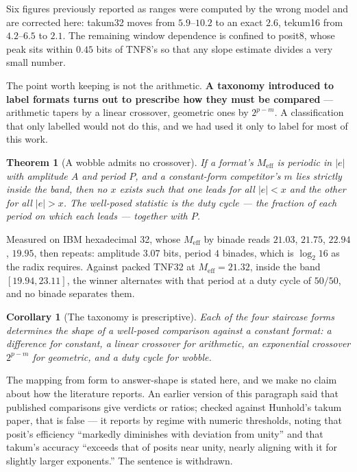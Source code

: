 \documentclass[11pt]{article}
\newtheorem{theorem}{Theorem}
\newtheorem{corollary}{Corollary}
\theoremstyle{definition}
\begin{document}
Six figures previously reported as ranges were computed by the wrong model and
are corrected here: takum32 moves from $5.9$--$10.2$ to an exact $2.6$, tekum16
from $4.2$--$6.5$ to $2.1$. The remaining window dependence is confined to
posit8, whose peak sits within $0.45$ bits of TNF8's so that any slope estimate
divides a very small number.

The point worth keeping is not the arithmetic. \textbf{A taxonomy introduced to label
formats turns out to prescribe how they must be compared} --- arithmetic tapers
by a linear crossover, geometric ones by $2^{p-m}$. A classification that only
labelled would not do this, and we had used it only to label for most of this
work.



\begin{theorem}[A wobble admits no crossover]
\label{thm:wobblecross}
If a format's $M_{\mathrm{eff}}$ is periodic in $|e|$ with amplitude $A$ and
period $P$, and a constant-form competitor's $m$ lies strictly inside the band,
then no $x$ exists such that one leads for all $|e| < x$ and the other for all
$|e| > x$. The well-posed statistic is the duty cycle --- the fraction of each
period on which each leads --- together with $P$.
\end{theorem}

Measured on IBM hexadecimal 32, whose $M_{\mathrm{eff}}$ by binade reads
$21.03$, $21.75$, $22.94$, $19.95$, then repeats: amplitude $3.07$ bits, period
$4$ binades, which is $\log_2 16$ as the radix requires. Against packed TNF32 at
$M_{\mathrm{eff}} = 21.32$, inside the band $[19.94, 23.11]$, the winner
alternates with that period at a duty cycle of $50/50$, and no binade separates
them.

\begin{corollary}[The taxonomy is prescriptive]
\label{cor:taxprescribes}
Each of the four staircase forms determines the \emph{shape} of a well-posed
comparison against a constant format: a difference for constant, a linear
crossover for arithmetic, an exponential crossover $2^{p-m}$ for geometric, and a
duty cycle for wobble.
\end{corollary}

The mapping from form to answer-shape is stated here, and we make no claim about
how the literature reports. An earlier version of this paragraph said that
published comparisons give verdicts or ratios; checked against Hunhold's takum
paper, that is false --- it reports by regime with numeric thresholds, noting
that posit's efficiency ``markedly diminishes with deviation from unity'' and
that takum's accuracy ``exceeds that of posits near unity, nearly aligning with
it for slightly larger exponents.'' The sentence is withdrawn.
\end{document}
